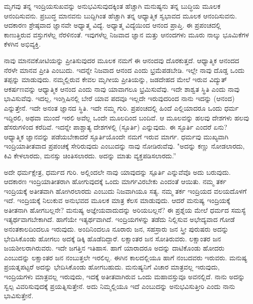 ಮೃಗವು ತನ್ನ ಇಂದ್ರಿಯಸುಖವನ್ನು ಅನುಭವಿಸುವುದಕ್ಕಿಂತ ಹೆಚ್ಚಾಗಿ ಮನುಷ್ಯನು ತನ್ನ ಬುದ್ಧಿಯ ಮೂಲಕ ಆನಂದಿಸುವನು. ಪ್ರಬುದ್ಧ ಮಾನವನು ಬುದ್ದಿಗಿಂತ ಹೆಚ್ಚಾಗಿ ತನ್ನ ಆಧ್ಯಾತ್ಮಿಕ ಸ್ವಭಾವದ ಮೂಲಕ ಆನಂದಿಸುವನು. ಆದಕಾರಣ ಶ್ರೇಷ್ಠವಾದ ಜ್ಞಾನವೇ ಅಧ್ಯಾತ್ಮ ವಿದ್ಯೆ. ಅಧ್ಯಾತ್ಮ ವಿದ್ಯೆಯಿಂದ ಆನಂದ ಪ್ರಾಪ್ತಿ. ಈ ಪ್ರಪಂಚದಲ್ಲಿ ಕಾಣುತ್ತಿರುವ ವಸ್ತುಗಳೆಲ್ಲ ನೆರಳಿನಂತೆ. ಇವುಗಳೆಲ್ಲ ನಿಜವಾದ ಜ್ಞಾನ ಮತ್ತು ಆನಂದಗಳು ಮೂರು ನಾಲ್ಕು ಭೂಮಿಕೆಗಳ ಕೆಳಗಿನ ಅಭಿವ್ಯಕ್ತಿ.

ನಾವು ಮಾನವಕೋಟಿಯನ್ನು ಪ್ರೀತಿಸುವುದರ ಮೂಲಕ ನಮಗೆ ಈ ಆನಂದವು ದೊರಕುತ್ತದೆ. ಆಧ್ಯಾತ್ಮಿಕ ಆನಂದದ ನೆರಳೇ ಮಾನವ ಪ್ರೀತಿ ಎಂಬುದು. ಇದನ್ನೇ ನಿಜವಾದ ಆನಂದ ಎಂದು ಭ್ರಮೆಪಡಬೇಡಿ. ಇಲ್ಲೇ ನಾವು ದೊಡ್ಡ ಒಂದು ತಪ್ಪನ್ನು ಮಾಡುವುದು. ನಮ್ಮಲ್ಲಿರುವ ಕೇವಲ ಮೃಗೀಯ ಪ್ರೀತಿಯನ್ನು, ಜಡದೇಹದ ಮೇಲೆ ಇರುವ ವಿದ್ಯುತ್ ಆಕರ್ಷಣವನ್ನು ಆಧ್ಯಾತ್ಮಿಕ ಆನಂದ ಎಂದು ನಾವು ಯಾವಾಗಲೂ ಭ್ರಮಿಸುವೆವು. ಇದೇ ಶಾಶ್ವತ ಸ್ಥಿತಿ ಎಂದು ನಾವು ಭಾವಿಸುವೆವು. ಇದಲ್ಲ, ಇಂಗ್ಲಿಷಿನಲ್ಲಿ ಬೇರೆ ಯಾವ ಪದವೂ ಇಲ್ಲದೇ ಇರುವುದರಿಂದ ನಾನು ಇದನ್ನು  (ಆನಂದ) ಎನ್ನುತ್ತೇನೆ. ಇದೇ ಅನಂತ ಜ್ಞಾನದ ಸ್ಥಿತಿ. ಇದೇ ನಮ್ಮ ಗುರಿ. ಪ್ರಪಂಚದಲ್ಲಿ ಹಿಂದೆ ಎಲ್ಲಿಯಾದರೂ ಒಂದು ಧರ್ಮ ಇದ್ದಿರಲಿ, ಅಥವಾ ಮುಂದೆ ಇರಲಿ ಅವೆಲ್ಲ ಒಂದೇ ಮೂಲದಿಂದ ಬಂದಿವೆ. ಆ ಮೂಲವನ್ನು ಹಲವು ದೇಶಗಳು ಹಲವು ಹೆಸರುಗಳಿಂದ ಕರೆದಿವೆ. ಇದನ್ನೇ ಪಾಶ್ಚಾತ್ಯ ದೇಶಗಳಲ್ಲಿ  (ಸ್ಫೂರ್ತಿ) ಎನ್ನುವುದು. ಈ ಸ್ಫೂರ್ತಿ ಎಂದರೆ ಏನು? ಆಧ್ಯಾತ್ಮಿಕ ಜ್ಞಾನವನ್ನು ಪಡೆಯಬೇಕಾದರೆ ಸ್ಫೂರ್ತಿಯೊಂದೇ ನಮಗೆ ಇರುವ ಮಾರ್ಗ. ಧರ್ಮವು ಮುಖ್ಯವಾಗಿ ಇಂದ್ರಿಯಾತೀತವಾದ ಪ್ರಪಂಚಕ್ಕೆ ಸೇರಿರುವುದು ಎಂಬುದನ್ನು ನಾವು ನೋಡಿರುವೆವು. "ಅದನ್ನು ಕಣ್ಣು ನೋಡಲಾರದು, ಕಿವಿ ಕೇಳಲಾರದು, ಮನಸ್ಸು ಚಿಂತಿಸಲಾರದು. ಅದನ್ನು ಮಾತು ವ್ಯಕ್ತಪಡಿಸಲಾರದು.”

ಅದೇ ಧರ್ಮಕ್ಷೇತ್ರ, ಧರ್ಮದ ಗುರಿ. ಅಲ್ಲಿಂದಲೇ ನಾವು ಯಾವುದನ್ನು ಸ್ಪೂರ್ತಿ ಎನ್ನುವೆವೊ ಅದು ಬರುವುದು. ಆದಕಾರಣ ಇಂದ್ರಿಯಾತೀತರಾಗಿ ಹೋಗುವುದಕ್ಕೆ ಒಂದು ಮಾರ್ಗವಿರಬೇಕು ಎಂದಂತೆ ಆಯಿತು. ನಮ್ಮ ತರ್ಕ ಇಂದ್ರಿಯಕ್ಕೆ ಅತೀತವಾಗಿ ಹೋಗಿರಲಾರದು ಎಂಬುದು ನಿಜವಾಗಿಯೂ ಸತ್ಯ. ನಮ್ಮ ತರ್ಕ ಇಂದ್ರಿಯದ ವಲಯದೊಳಗೆ ಇದೆ. ಇಂದ್ರಿಯಕ್ಕೆ ನಿಲುಕುವ ಅನುಭವದ ಮೂಲಕ ಮಾತ್ರ ಕೆಲಸ ಮಾಡುವುದು. ಆದರೆ ಮನುಷ್ಯ ಇಂದ್ರಿಯಕ್ಕೆ ಅತೀತನಾಗಿ ಹೋಗಬಲ್ಲನೇ? ಮನುಷ್ಯ ಅಜ್ಞೇಯವಾದುದನ್ನು ಅರಿಯಬಲ್ಲನೆ? ಈ ಪ್ರಶ್ನೆಯ ಮೇಲೆ ಧರ್ಮದ ಸಮಸ್ಯೆ ಇತ್ಯರ್ಥವಾಗಬೇಕಾಗಿದೆ. ಹಾಗೆಯೇ ಇತ್ಯರ್ಥವಾಗಿದೆ. ಇಂದ್ರಿಯಗಳನ್ನು ತಡೆದು ನಿಲ್ಲಿಸುವ ಅಭೇದ್ಯವಾದ ಗೋಡೆ ಅನಂತಕಾಲದಿಂದಲೂ ಇರುವುದು. ಅಂದಿನಿಂದಲೂ ನೂರಾರು ಜನ, ಸಹಸ್ರಾರು ಜನ ಸ್ತ್ರೀ ಪುರುಷರು ಅದನ್ನು ಭೇದಿಸಿಕೊಂಡು ಹೋಗಲು ಅದಕ್ಕೆ ಡಿಕ್ಕಿ ಹೊಡೆದಿದ್ದಾರೆ. ಲಕ್ಷಾಂತರ ಜನ ಸೋತಿರುವರು. ಲಕ್ಷಾಂತರ ಜನ ಜಯಶೀಲರಾಗಿರುವರು. ಇದೇ ಜಗತ್ತಿನ ಇತಿಹಾಸ. ಹಾಗೆ ಯಾರಾದರೂ ಅದನ್ನು ದಾಟಿಕೊಂಡು ಹೋದರು ಎಂಬುದನ್ನು ಲಕ್ಷಾಂತರ ಜನ ನಂಬುತ್ತಲೇ ಇರಲಿಲ್ಲ. ಈಗಿನ ಕಾಲದಲ್ಲಿಯೂ ಹಾಗೆ ನಂಬದವರು ಇರುವರು. ಮನುಷ್ಯ ಪ್ರಯತ್ನಪಟ್ಟರೆ ಅದನ್ನು ಭೇದಿಸಿಕೊಂಡು ಹೋಗಬಹುದು. ಮನುಷ್ಯನಿಗೆ ವಿಚಾರ ಮಾತ್ರವಲ್ಲ ಇರುವುದು, ಇಂದ್ರಿಯಗಳು ಮಾತ್ರವಲ್ಲ ಇರುವುದು, ಇದಕ್ಕೆ ಅತೀತವಾಗಿರುವ ಒಂದು ಮಹಾವಸ್ತುವೂ ಅವನಲ್ಲಿದೆ. ನಾನು ಅದನ್ನು ಸ್ವಲ್ಪ ವಿವರಿಸುವುದಕ್ಕೆ ಪ್ರಯತ್ನಿಸುತ್ತೇನೆ. ಅದು ನಿಮ್ಮಲ್ಲಿಯೂ ಇದೆ ಎಂಬುದನ್ನು ಅನುಭವಿಸುತ್ತೀರಿ ಎಂದು ನಾನು ಭಾವಿಸುತ್ತೇನೆ.

